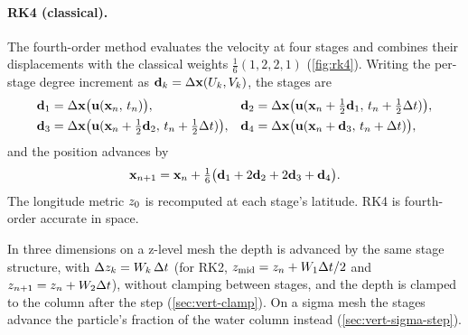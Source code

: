 \paragraph{RK4 (classical).} The fourth-order method evaluates the velocity at four
stages and combines their displacements with the classical weights $\tfrac16(1,2,2,1)$
(\cref{fig:rk4}). Writing the per-stage degree increment as
$\mathbf{d}_k=\Delta\mathbf{x}(U_k,V_k)$, the stages are
\begin{align}\label{eq:rk4}
  \mathbf{d}_1 &= \Delta\mathbf{x}\bigl(\mathbf{u}(\mathbf{x}_n,\,t_n)\bigr), &
  \mathbf{d}_2 &= \Delta\mathbf{x}\bigl(\mathbf{u}(\mathbf{x}_n+\tfrac12\mathbf{d}_1,\,t_n+\tfrac12\Delta t)\bigr), \notag\\
  \mathbf{d}_3 &= \Delta\mathbf{x}\bigl(\mathbf{u}(\mathbf{x}_n+\tfrac12\mathbf{d}_2,\,t_n+\tfrac12\Delta t)\bigr), &
  \mathbf{d}_4 &= \Delta\mathbf{x}\bigl(\mathbf{u}(\mathbf{x}_n+\mathbf{d}_3,\,t_n+\Delta t)\bigr),
\end{align}
and the position advances by
\begin{equation}\label{eq:rk4-combine}
  \mathbf{x}_{n+1} = \mathbf{x}_n + \tfrac{1}{6}\bigl(\mathbf{d}_1 + 2\mathbf{d}_2 + 2\mathbf{d}_3 + \mathbf{d}_4\bigr).
\end{equation}
The longitude metric $z_{0}$ is recomputed at each stage's latitude. RK4 is fourth-order accurate in
space.

In three dimensions on a z-level mesh the depth is advanced by the same stage structure, with
$\Delta z_k=W_k\,\Delta t$ (for RK2, $z_{\text{mid}}=z_n+W_1\Delta t/2$ and
$z_{n+1}=z_n+W_2\Delta t$), without clamping between stages, and the depth is clamped to the
column after the step (\cref{sec:vert-clamp}). On a sigma mesh the stages advance the particle's
fraction of the water column instead (\cref{sec:vert-sigma-step}).

